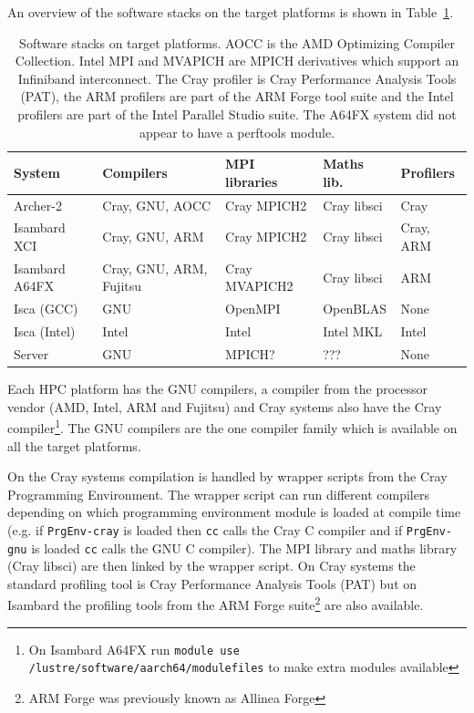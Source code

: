 \documentclass[a4paper,titlepage]{article}
\begin{document}
An overview of the software stacks on the target platforms is shown in Table~\ref{tab:software}. 
\begin{table}[htp]
\begin{center}
\begin{tabular}{|l|l|l|l|l|}
\hline 
System         & Compilers               & MPI libraries  & Maths lib.       & Profilers  \\
\hline
Archer-2       & Cray, GNU, AOCC         & Cray MPICH2     & Cray libsci     & Cray      \\
Isambard XCI   & Cray, GNU, ARM          & Cray MPICH2     & Cray libsci     & Cray, ARM \\
Isambard A64FX & Cray, GNU, ARM, Fujitsu & Cray MVAPICH2   & Cray libsci     & ARM       \\
Isca (GCC)     & GNU                     & OpenMPI         & OpenBLAS        & None      \\
Isca (Intel)   & Intel                   & Intel           & Intel MKL       & Intel     \\
Server         & GNU                     & MPICH?          & ???             & None      \\
\hline
\end{tabular}
\end{center}
\caption{Software stacks on target platforms. AOCC is the AMD Optimizing Compiler Collection. Intel MPI and MVAPICH are MPICH derivatives which support an Infiniband interconnect.
The Cray profiler is Cray Performance Analysis Tools (PAT), the ARM profilers are part of the ARM Forge tool suite and the Intel profilers are part of the Intel Parallel Studio suite.
The A64FX system did not appear to have a perftools module.}
\label{tab:software}
\end{table}
Each HPC platform has the GNU compilers, a compiler from the processor vendor (AMD, Intel, ARM and Fujitsu) and Cray systems also have the Cray compiler\footnote{On Isambard A64FX run \texttt{module use /lustre/software/aarch64/modulefiles} to make extra modules available}. The GNU compilers are the one compiler family which is available on all the target platforms.

On the Cray systems compilation is handled by wrapper scripts from the Cray Programming Environment. The wrapper script can run different compilers depending on which programming environment module is loaded at compile time (e.g. if \texttt{PrgEnv-cray} is loaded then \texttt{cc} calls the Cray C compiler and if \texttt{PrgEnv-gnu} is loaded \texttt{cc} calls the GNU C compiler). The MPI library and maths library (Cray libsci) are then linked by the wrapper script. On Cray systems the standard profiling tool is Cray Performance Analysis Tools (PAT) but on Isambard the profiling tools from the ARM Forge suite\footnote{ARM Forge was previously known as Allinea Forge} are also available.
\end{document}
